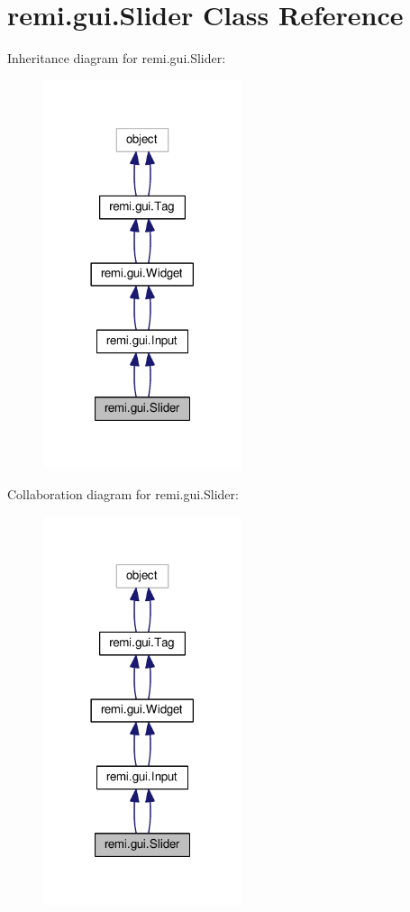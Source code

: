 \hypertarget{classremi_1_1gui_1_1Slider}{}\section{remi.\+gui.\+Slider Class Reference}
\label{classremi_1_1gui_1_1Slider}


Inheritance diagram for remi.\+gui.\+Slider\+:
\nopagebreak
\begin{figure}[H]
\begin{center}
\leavevmode
\includegraphics[width=165pt]{d5/d13/classremi_1_1gui_1_1Slider__inherit__graph}
\end{center}
\end{figure}


Collaboration diagram for remi.\+gui.\+Slider\+:
\nopagebreak
\begin{figure}[H]
\begin{center}
\leavevmode
\includegraphics[width=165pt]{d6/db5/classremi_1_1gui_1_1Slider__coll__graph}
\end{center}
\end{figure}
